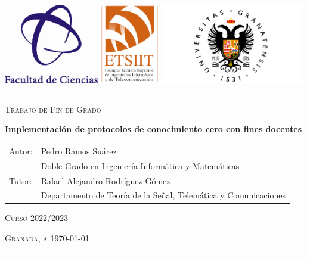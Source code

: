 \begin{titlepage}
\includegraphics[height=35mm]{images/Ciencias.png}
\includegraphics[height=35mm]{images/ETSIIT.png}
\hfill
\includegraphics[height=35mm]{images/UGR.png}

\vspace{0.5cm}
\hrule
\vspace{1cm}

{\Large\centering \textsc{Trabajo de Fin de Grado} \par}
\vspace{1cm}
{\Huge\centering \textbf{Implementación de protocolos de conocimiento cero con fines docentes} \par}
\vspace{0.5cm}

\vfill
\begin{table}[h!]
    \begin{tabular}{p{}p{}}
        {\large Autor:} & {\large Pedro Ramos Suárez} \\
        & {Doble Grado en Ingeniería Informática y Matemáticas} \\[1cm]
        {\large Tutor:} & {\large Rafael Alejandro Rodríguez Gómez} \\
        & {Departamento de Teoría de la Señal, Telemática y Comunicaciones}
    \end{tabular}
\end{table}

\vfill
{\Large\centering \textsc{Curso 2022/2023} \par}
{\Large\centering \textsc{Granada, a \today} \par}
\vspace{1cm}

\hrule
\vspace{0.3cm}
\end{titlepage}